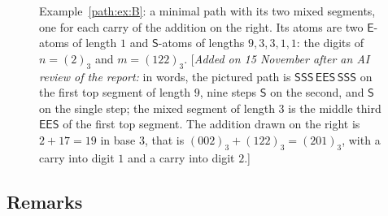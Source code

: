 \documentclass[11pt]{article}
\theoremstyle{definition}
\theoremstyle{remark}
\numberwithin{equation}{section}
\numberwithin{figure}{section}
\newcommand{\E}{\textsf{E}}
\newcommand{\Ss}{\textsf{S}}
\newcommand{\revnote}[1]{[\emph{Added on 15 November after an AI review of the report:} #1]}
\begin{document}
\begin{figure}[ht]
\caption{Example~\ref{path:ex:B}: a minimal path with its two mixed segments, one for each carry of the addition on
the right. Its atoms are two $\E$-atoms of length $1$ and $\Ss$-atoms of lengths $9,3,3,1,1$: the digits of $n=(2)_3$ and
$m=(122)_3$.
\revnote{in words, the pictured path is $\Ss\Ss\Ss\,\E\E\Ss\,\Ss\Ss\Ss$ on the first top segment of length
$9$, nine steps $\Ss$ on the second, and $\Ss$ on the single step; the mixed segment of length $3$ is the
middle third $\E\E\Ss$ of the first top segment. The addition drawn on the right is $2+17=19$ in base $3$,
that is $(002)_3+(122)_3=(201)_3$, with a carry into digit $1$ and a carry into digit $2$.}}
\label{path:fig:exB}
\end{figure}

\subsection{Remarks}\label{path:sec:remarks}
\end{document}
